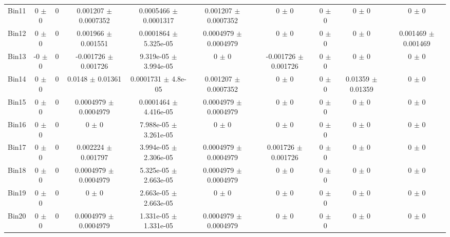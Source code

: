 \begin{tabular}{@{\extracolsep{4pt}}lccccccccc@{}}
     Bin11 & 0 $\pm$ 0 & 0 & 0.001207 $\pm$ 0.0007352 & 0.0005466 $\pm$ 0.0001317 & 0.001207 $\pm$ 0.0007352 & 0 $\pm$ 0 & 0 $\pm$ 0 & 0 $\pm$ 0 & 0 $\pm$ 0 \\ 
     Bin12 & 0 $\pm$ 0 & 0 & 0.001966 $\pm$ 0.001551 & 0.0001864 $\pm$ 5.325e-05 & 0.0004979 $\pm$ 0.0004979 & 0 $\pm$ 0 & 0 $\pm$ 0 & 0 $\pm$ 0 & 0.001469 $\pm$ 0.001469 \\ 
     Bin13 & -0 $\pm$ 0 & 0 & -0.001726 $\pm$ 0.001726 & 9.319e-05 $\pm$ 3.994e-05 & 0 $\pm$ 0 & -0.001726 $\pm$ 0.001726 & 0 $\pm$ 0 & 0 $\pm$ 0 & 0 $\pm$ 0 \\ 
     Bin14 & 0 $\pm$ 0 & 0 & 0.0148 $\pm$ 0.01361 & 0.0001731 $\pm$ 4.8e-05 & 0.001207 $\pm$ 0.0007352 & 0 $\pm$ 0 & 0 $\pm$ 0 & 0.01359 $\pm$ 0.01359 & 0 $\pm$ 0 \\ 
     Bin15 & 0 $\pm$ 0 & 0 & 0.0004979 $\pm$ 0.0004979 & 0.0001464 $\pm$ 4.416e-05 & 0.0004979 $\pm$ 0.0004979 & 0 $\pm$ 0 & 0 $\pm$ 0 & 0 $\pm$ 0 & 0 $\pm$ 0 \\ 
     Bin16 & 0 $\pm$ 0 & 0 & 0 $\pm$ 0 & 7.988e-05 $\pm$ 3.261e-05 & 0 $\pm$ 0 & 0 $\pm$ 0 & 0 $\pm$ 0 & 0 $\pm$ 0 & 0 $\pm$ 0 \\ 
     Bin17 & 0 $\pm$ 0 & 0 & 0.002224 $\pm$ 0.001797 & 3.994e-05 $\pm$ 2.306e-05 & 0.0004979 $\pm$ 0.0004979 & 0.001726 $\pm$ 0.001726 & 0 $\pm$ 0 & 0 $\pm$ 0 & 0 $\pm$ 0 \\ 
     Bin18 & 0 $\pm$ 0 & 0 & 0.0004979 $\pm$ 0.0004979 & 5.325e-05 $\pm$ 2.663e-05 & 0.0004979 $\pm$ 0.0004979 & 0 $\pm$ 0 & 0 $\pm$ 0 & 0 $\pm$ 0 & 0 $\pm$ 0 \\ 
     Bin19 & 0 $\pm$ 0 & 0 & 0 $\pm$ 0 & 2.663e-05 $\pm$ 2.663e-05 & 0 $\pm$ 0 & 0 $\pm$ 0 & 0 $\pm$ 0 & 0 $\pm$ 0 & 0 $\pm$ 0 \\ 
     Bin20 & 0 $\pm$ 0 & 0 & 0.0004979 $\pm$ 0.0004979 & 1.331e-05 $\pm$ 1.331e-05 & 0.0004979 $\pm$ 0.0004979 & 0 $\pm$ 0 & 0 $\pm$ 0 & 0 $\pm$ 0 & 0 $\pm$ 0 \\ 
\hline\hline
  \end{tabular}
